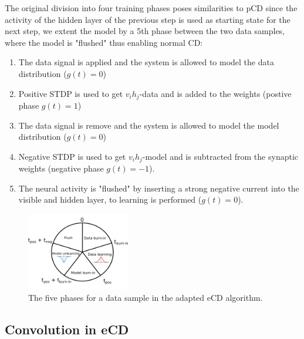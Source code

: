 The original division into four training phases poses similarities to pCD since the activity of the hidden layer of the previous step is used as starting state for the next step, we extent the model by a 5th phase between the two data samples, where the model is "flushed" thus enabling normal CD:

\begin{enumerate}
\item The data signal is applied and the system is allowed to model the data distribution ($g(t)=0$)
\item Positive STDP is used to get $v_i h_j$-data and is added to the weights (postive phase $g(t)=1$)
\item The data signal is remove and the system is allowed to model the model distribution ($g(t)=0$)
\item Negative STDP is used to get $v_i h_j$-model and is subtracted from the synaptic weights (negative phase $g(t)=-1$).
\item The neural activity is "flushed" by inserting a strong negative current into the visible and hidden layer, to learning is performed ($g(t)=0$).
\end{enumerate}

\begin{figure}
	\centering
    	\includegraphics[width=0.4\textwidth]{imgs/eCD_5phases.png} 
    \caption{The five phases for a data sample in the adapted eCD algorithm. }
	\label{fig:ecd5}
\end{figure}


\subsection{Convolution in eCD}

